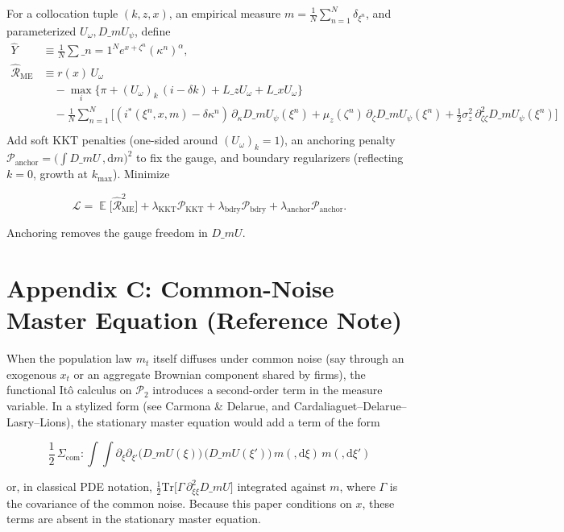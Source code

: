 ﻿\documentclass[11pt,letterpaper,oneside]{article}
\numberwithin{equation}{section}
\DeclareMathOperator{\E}{\mathbb{E}}
\newcommand{\1}{\mathbf{1}}
\newcommand{\diff}{,\mathrm{d}}
\newcommand{\Lz}{L\_z}
\newcommand{\Lx}{L\_x}
\newcommand{\dmU}{D\_m U}
\newcommand{\Dm}{D\_m}
\begin{document}
For a collocation tuple $(k,z,x)$, an empirical measure $m=\tfrac1N\sum_{n=1}^N \delta_{\xi^n}$, and parameterized $U_\omega,\dmU_\psi$, define
\begin{align*}
\widehat{Y} &\equiv \frac{1}{N}\sum\_{n=1}^N e^{x+\zeta^n}(\kappa^n)^\alpha,\\
\widehat{\mathcal{R}}_{\mathrm{ME}} &\equiv r(x)\,U_\omega\\
  &\quad - \max_{i}\Big\{ \pi + (U_{\omega})_k\,(i-\delta k) + \Lz U_{\omega} + \Lx U_{\omega} \Big\} \\
  &\quad - \frac{1}{N}\sum_{n=1}^N \Big[ (i^*(\xi^n,x,m)-\delta\kappa^n)\,\partial_{\kappa}\dmU_{\psi}(\xi^n)
    + \mu_z(\zeta^n)\,\partial_{\zeta}\dmU_{\psi}(\xi^n)
    + \tfrac12 \sigma_z^2\,\partial^2_{\zeta\zeta}\dmU_{\psi}(\xi^n) \Big] \\
  &\quad \phantom{.}
  \end{align*}
  Add soft KKT penalties (one-sided around $(U_\omega)_k=1$), an anchoring penalty $\mathcal{P}_{\mathrm{anchor}}=\big(\int \dmU\,\diff m\big)^2$ to fix the gauge, and boundary regularizers (reflecting $k=0$, growth at $k_{\max}$). Minimize

$$
\mathcal{L}=\E\big[\widehat{\mathcal{R}}_{\mathrm{ME}}^2\big]+\lambda_{\mathrm{KKT}}\mathcal{P}_{\mathrm{KKT}}
+\lambda_{\mathrm{bdry}}\mathcal{P}_{\mathrm{bdry}}+\lambda_{\mathrm{anchor}}\mathcal{P}_{\mathrm{anchor}}.
$$

Anchoring removes the gauge freedom in $\dmU$.

\section{Appendix C: Common-Noise Master Equation (Reference Note)}\label{app:common-noise}

When the population law $m_t$ itself diffuses under common noise (say through an exogenous $x_t$ or an aggregate Brownian component shared by firms), the functional Itô calculus on $\mathcal P_2$ introduces a second-order term in the measure variable. In a stylized form (see Carmona \& Delarue, and Cardaliaguet--Delarue--Lasry--Lions), the stationary master equation would add a term of the form

$$
\frac{1}{2}\,\Sigma_{\mathrm{com}}:\!\int\!\!\int
\partial_{\xi}\partial_{\xi'} \big(\Dm U(\xi)\big)\,\big(\Dm U(\xi')\big)
\, m(\diff \xi)\, m(\diff \xi')
$$

or, in classical PDE notation,
$\tfrac12 \mathrm{Tr}\big[\Gamma\,\partial_{\xi\xi}^2 \dmU\big]$
integrated against $m$, where $\Gamma$ is the covariance of the common noise. Because this paper conditions on $x$, these terms are absent in the stationary master equation.
\end{document}
